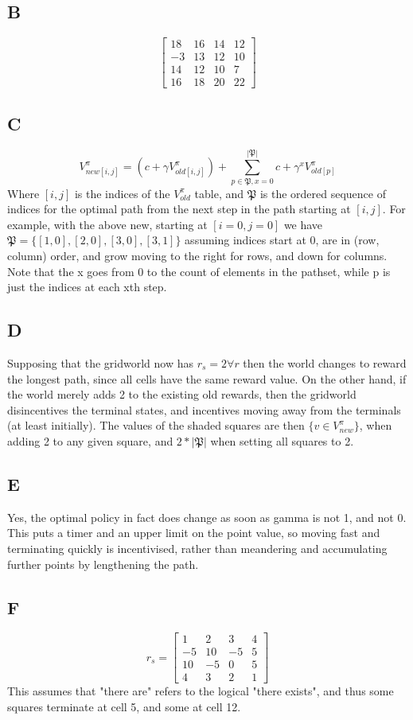 \documentclass{article}
\begin{document}
\subsection{B}
\[
\begin{bmatrix}
	18 & 16 & 14 & 12 \\
	-3 & 13 & 12 & 10 \\
	14 & 12 & 10 & 7 \\
	16 & 18 & 20 & 22
\end{bmatrix}
\]

\subsection{C}
\[
	V^{\pi}_{new[i,j]} = (c +\gamma V^{\pi}_{old[i,j]}) + \displaystyle\sum^{|\mathfrak{P}|}_{p \in \mathfrak{P}, x = 0} c + \gamma^x V^{\pi}_{old[p]}
\]
Where $[i,j]$ is the indices of the $V^{\pi}_{old}$ table, and $\mathfrak{P}$ is the ordered sequence of indices for the optimal path from the next step in the path starting at $[i,j]$.
For example, with the above new, starting at $[i=0,j=0]$ we have $\mathfrak{P}=
\{[1,0], [2,0], [3,0],[3,1]\}$ assuming indices start at 0, are in (row, column)
order, and grow moving to the right for rows, and down for columns.
Note that the x goes from 0 to the count of elements in the pathset, while p is
just the indices at each xth step.

\subsection{D}
Supposing that the gridworld now has $r_s = 2 \forall r$ then the world changes
to reward the longest path, since all cells have the same reward value.
On the other hand, if the world merely adds 2 to the existing old rewards, then 
the gridworld disincentives the terminal states, and incentives moving away
from the terminals (at least initially).
The values of the shaded squares are then $\{v \in V^{\pi}_{new}\}$, when adding 2 to
any given square, and $2*|\mathfrak{P}|$ when setting all squares to 2.

\subsection{E}
Yes, the optimal policy in fact does change as soon as gamma is not 1, and not 0.
This puts a timer and an upper limit on the point value, so moving fast and 
terminating quickly is incentivised, rather than meandering and accumulating 
further points by lengthening the path.

\subsection{F}
\[ r_s = 
	\begin{bmatrix}
		1 & 2 & 3 & 4 \\
		-5 & 10 & -5 & 5 \\
		10 & -5 & 0 & 5\\
		4 & 3 & 2 & 1
	\end{bmatrix}
\]
This assumes that "there are" refers to the logical "there exists", and thus some
squares terminate at cell 5, and some at cell 12.
\end{document}

